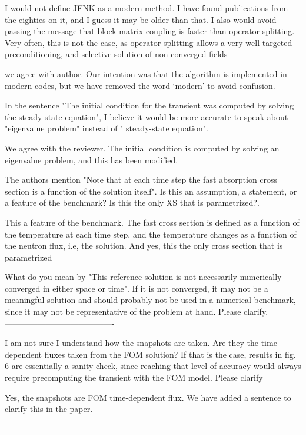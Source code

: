 \documentclass[10pt]{article}
\begin{document}
\begin{response}{I would not define JFNK as a modern method. I have found publications from the eighties on it, and I guess it may be older than that. I also would avoid passing the message that block-matrix coupling is faster than operator-splitting. Very often, this is not the case, as operator splitting allows a very well targeted preconditioning, and selective solution of non-converged fields
}

we agree with author. Our intention was that the algorithm is implemented in modern codes, but we have removed the word `modern' to avoid confusion.
  
\end{response}

\begin{response}{
 In the sentence "The initial condition for the transient was computed by solving the steady-state equation", I believe it would be more accurate to speak about "eigenvalue problem" instead of " steady-state equation".}

We agree with the reviewer. The initial condition is computed by solving an eigenvalue problem, and this has been modified.

\end{response}

\begin{response}{The authors mention "Note that at each time step the fast absorption cross section is a function of the solution itself". Is this an assumption, a statement, or a feature of the benchmark? Is this the only XS that is parametrized?.}
		
This a feature of the benchmark. The fast cross section is defined as a function of the temperature at each time step, and the temperature changes as a function of the neutron flux, i.e, the solution. And yes, this the only cross section that is parametrized
\end{response}

\begin{response}
  {What do you mean by "This reference solution is not necessarily numerically converged in either space or time". If it is not converged, it may not be a meaningful solution and should probably not be used in a numerical benchmark, since it may not be representative of the problem at hand. Please clarify.}
  ----------------------------------------
	
\end{response}

\begin{response}
	{ I am not sure I understand how the snapshots are taken. Are they the time dependent fluxes taken from the FOM solution? If that is the case, results in fig. 6 are essentially a sanity check, since reaching that level of accuracy would always require precomputing the transient with the FOM model. Please clarify}
	
	Yes, the snapshots are FOM time-dependent flux. We have added a sentence to clarify this in the paper.
	
------------------------------------
\end{response}
\end{document}

